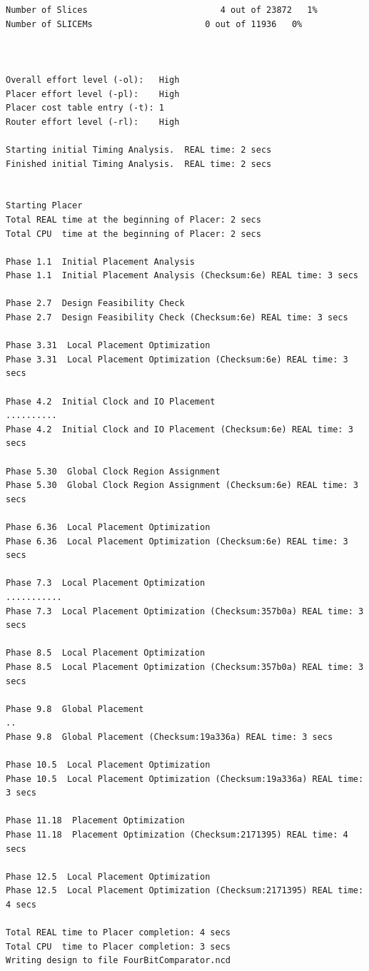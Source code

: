 \documentclass[fleqn]{article}
\begin{document}
\begin{latin}
\begin{lstlisting}[basicstyle=\tiny]
Number of Slices                          4 out of 23872   1%
Number of SLICEMs                      0 out of 11936   0%



Overall effort level (-ol):   High 
Placer effort level (-pl):    High 
Placer cost table entry (-t): 1
Router effort level (-rl):    High 

Starting initial Timing Analysis.  REAL time: 2 secs 
Finished initial Timing Analysis.  REAL time: 2 secs 


Starting Placer
Total REAL time at the beginning of Placer: 2 secs 
Total CPU  time at the beginning of Placer: 2 secs 

Phase 1.1  Initial Placement Analysis
Phase 1.1  Initial Placement Analysis (Checksum:6e) REAL time: 3 secs 

Phase 2.7  Design Feasibility Check
Phase 2.7  Design Feasibility Check (Checksum:6e) REAL time: 3 secs 

Phase 3.31  Local Placement Optimization
Phase 3.31  Local Placement Optimization (Checksum:6e) REAL time: 3 secs 

Phase 4.2  Initial Clock and IO Placement
..........
Phase 4.2  Initial Clock and IO Placement (Checksum:6e) REAL time: 3 secs 

Phase 5.30  Global Clock Region Assignment
Phase 5.30  Global Clock Region Assignment (Checksum:6e) REAL time: 3 secs 

Phase 6.36  Local Placement Optimization
Phase 6.36  Local Placement Optimization (Checksum:6e) REAL time: 3 secs 

Phase 7.3  Local Placement Optimization
...........
Phase 7.3  Local Placement Optimization (Checksum:357b0a) REAL time: 3 secs 

Phase 8.5  Local Placement Optimization
Phase 8.5  Local Placement Optimization (Checksum:357b0a) REAL time: 3 secs 

Phase 9.8  Global Placement
..
Phase 9.8  Global Placement (Checksum:19a336a) REAL time: 3 secs 

Phase 10.5  Local Placement Optimization
Phase 10.5  Local Placement Optimization (Checksum:19a336a) REAL time: 3 secs 

Phase 11.18  Placement Optimization
Phase 11.18  Placement Optimization (Checksum:2171395) REAL time: 4 secs 

Phase 12.5  Local Placement Optimization
Phase 12.5  Local Placement Optimization (Checksum:2171395) REAL time: 4 secs 

Total REAL time to Placer completion: 4 secs 
Total CPU  time to Placer completion: 3 secs 
Writing design to file FourBitComparator.ncd




\end{lstlisting}
\end{latin}
\end{document}
